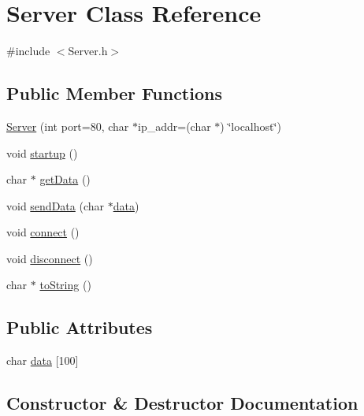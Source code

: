 \hypertarget{classServer}{}\section{Server Class Reference}
\label{classServer}


{\ttfamily \#include $<$Server.\+h$>$}

\subsection*{Public Member Functions}
\begin{DoxyCompactItemize}
\item 
\hyperlink{classServer_a693b9b86cd9538ff4833a550515cabf8}{Server} (int port=80, char $\ast$ip\+\_\+addr=(char $\ast$) \char`\"{}localhost\char`\"{})
\item 
void \hyperlink{classServer_aaa7517710dd809ba4d965eb83801fd05}{startup} ()
\item 
char $\ast$ \hyperlink{classServer_a6b6c39b02aeae611dcb2a9f2f5a8d801}{get\+Data} ()
\item 
void \hyperlink{classServer_a5061ce779b01e1c5cf8146022db8b08d}{send\+Data} (char $\ast$\hyperlink{classServer_a511bae2c5604c196eb714c798fdf709d}{data})
\item 
void \hyperlink{classServer_a0bd7069e79b4d5268f0947079e1af54a}{connect} ()
\item 
void \hyperlink{classServer_acd0114484495cfd2749816ddb12e4246}{disconnect} ()
\item 
char $\ast$ \hyperlink{classServer_aee9a13517df765d3c085fab605f24be4}{to\+String} ()
\end{DoxyCompactItemize}
\subsection*{Public Attributes}
\begin{DoxyCompactItemize}
\item 
char \hyperlink{classServer_a511bae2c5604c196eb714c798fdf709d}{data} \mbox{[}100\mbox{]}
\end{DoxyCompactItemize}


\subsection{Constructor \& Destructor Documentation}
\mbox{\label{classServer_a693b9b86cd9538ff4833a550515cabf8}} 
